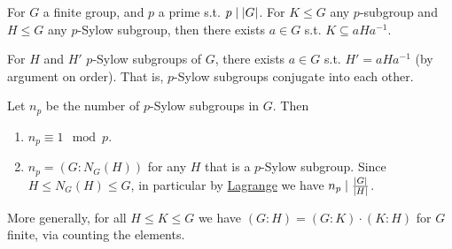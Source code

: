 \documentclass{article}
\begin{document}
\begin{theorem}[Sylow II]\label{thm: Sylow II}
    For $G$ a finite group, and $p$ a prime s.t. $p \mid \left|G\right|$. For $K \leq G$ any $p$-subgroup and $H \leq G$ any $p$-Sylow subgroup, then there exists $a \in G$ s.t. $K \subseteq aHa^{-1}$.
\end{theorem}

\begin{corollary}\label{cor: p-sylow conjugates into each other}
    For $H$ and $H'$ $p$-Sylow subgroups of $G$, there exists $a \in G$ s.t. $H' = aHa^{-1}$ (by argument on order). That is, $p$-Sylow subgroups conjugate into each other.
\end{corollary}

\begin{theorem}\label{thm: Sylow III}
    Let $n_p$ be the number of $p$-Sylow subgroups in $G$. Then
    \begin{enumerate}[label=\arabic*)]
        \item $n_p \equiv 1 \mod{p}$.
        \item $n_p = (G: N_G(H))$ for any $H$ that is a $p$-Sylow subgroup. Since $H \leq N_G(H) \leq G$, in particular by \hyperref[thm: Lagrange]{Lagrange} we have $n_p \mid \frac{\left|G\right|}{\left|H\right|}$.
    \end{enumerate}
\end{theorem}

\begin{remark}
    More generally, for all $H \leq K \leq G$ we have $(G : H) = (G : K) \cdot (K : H)$ for $G$ finite, via counting the elements.
\end{remark}
\end{document}
